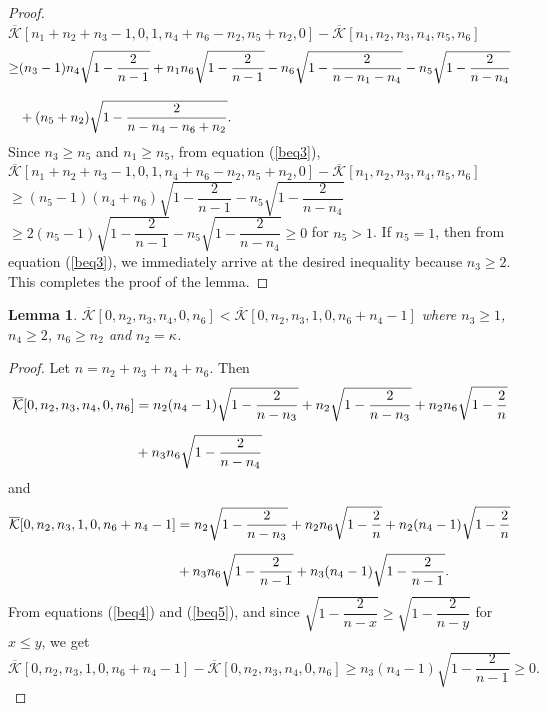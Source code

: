 \documentclass[12pt]{article}
\newtheorem{lemma}[theorem]{Lemma}
\begin{document}
\begin{proof}
$\overline{\mathcal{K}}[n_{1}+n_{2}+n_{3}-1,0,1,n_{4}+n_{6}-n_{2},n_{5}+n_{2},0]- \overline{\mathcal{K}}[n_{1},n_{2},n_{3},n_{4},n_{5},n_{6}]$
\begin{align}\label{beq3}
\ge &(n_{3}-1)n_{4}\sqrt{1-\dfrac{2}{n-1}}+n_{1}n_{6}\sqrt{1-\dfrac{2}{n-1}}-n_{6}\sqrt{1-\dfrac{2}{n-n_{1}-n_{4}}}-n_{5}\sqrt{1-\dfrac{2}{n-n_{4}}}\notag\\[3mm]&+(n_5+n_{2})\sqrt{1-\dfrac{2}{n-n_{4}-n_{6}+n_{2}}}.\end{align}
Since $n_{3}\ge n_{5}$ and $n_{1}\ge n_{5}$, from equation (\ref{beq3}),\\[2mm]  
$\overline{\mathcal{K}}[n_{1}+n_{2}+n_{3}-1,0,1,n_{4}+n_{6}-n_{2},n_{5}+n_{2},0]- \overline{\mathcal{K}}[n_{1},n_{2},n_{3},n_{4},n_{5},n_{6}]$\\[2mm]
$\ge (n_{5}-1)(n_{4}+n_{6})\sqrt{1-\dfrac{2}{n-1}}-n_{5}\sqrt{1-\dfrac{2}{n-n_{4}}}$\\[3mm]
$\ge 2(n_{5}-1)\sqrt{1-\dfrac{2}{n-1}}-n_{5}\sqrt{1-\dfrac{2}{n-n_{4}}}\ge 0$ for $n_{5}>1$. If $n_{5}=1$, then from equation (\ref{beq3}), we immediately arrive at the desired inequality because $n_{3}\ge 2$. This completes the proof of the lemma.  
\end{proof}
\begin{lemma}\label{bl2}
 $\overline{\mathcal{K}}[0,n_{2},n_{3},n_{4},0,n_{6}]< \overline{\mathcal{K}}[0,n_{2},n_{3},1,0,n_{6}+n_{4}-1]$ where $n_{3}\ge 1$, $n_{4}\ge 2$,  $n_{6}\ge n_{2}$ and $n_{2}=\kappa$.	
\end{lemma}
\begin{proof}
Let $n=n_{2}+n_{3}+n_{4}+n_{6}$. Then
\begin{align}\label{beq4}\overline{\mathcal{K}}[0,n_{2},n_{3},n_{4},0,n_{6}]&= n_{2}(n_{4}-1)\sqrt{1-\dfrac{2}{n-n_{3}}}+n_{2}\sqrt{1-\dfrac{2}{n-n_{3}}}+n_{2}n_{6}\sqrt{1-\dfrac{2}{n}}\notag\\[2mm]&+n_{3}n_{6}\sqrt{1-\dfrac{2}{n-n_{4}}}
\end{align}
 and
\begin{align}\label{beq5}\overline{\mathcal{K}}[0,n_{2},n_{3},1,0,n_{6}+n_{4}-1]&=n_{2}\sqrt{1-\dfrac{2}{n-n_{3}}}+n_{2}n_{6}\sqrt{1-\dfrac{2}{n}}+n_{2}(n_{4}-1)\sqrt{1-\dfrac{2}{n}}\notag\\[2mm]&+n_{3}n_{6}\sqrt{1-\dfrac{2}{n-1}}+n_{3}(n_{4}-1)\sqrt{1-\dfrac{2}{n-1}}.\end{align} 
From equations (\ref{beq4}) and (\ref{beq5}), and since $\sqrt{1-\dfrac{2}{n-x}}\ge \sqrt{1-\dfrac{2}{n-y}}$ for $x\le y$, we get
$\overline{\mathcal{K}}[0,n_{2},n_{3},1,0,n_{6}+n_{4}-1]-\overline{\mathcal{K}}[0,n_{2},n_{3},n_{4},0,n_{6}]\ge n_{3}(n_{4}-1)\sqrt{1-\dfrac{2}{n-1}}\ge 0.$	
\end{proof}
\end{document}
